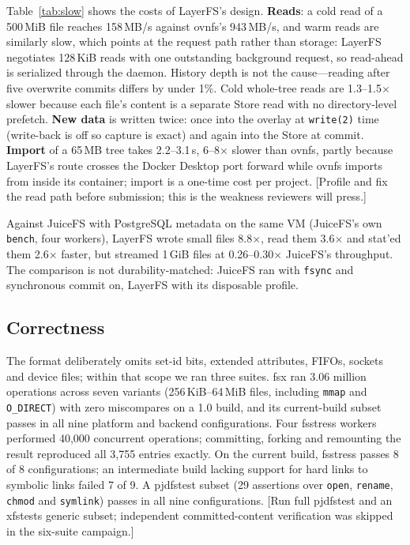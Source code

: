\documentclass[letterpaper,twocolumn,10pt]{article}
\newif\ifdraft\drafttrue
\newcommand{\dnote}[1]{\ifdraft\textcolor{red!70!black}{\textsf{\small[#1]}}\fi}
\newcommand{\sys}{LayerFS}
\newcommand{\X}{$\times$}
\begin{document}
Table~\ref{tab:slow} shows the costs of \sys{}'s design. \textbf{Reads}:
a cold read of a 500\,MiB file reaches 158\,MB/s against ovnfs's 943\,MB/s,
and warm reads are similarly slow, which points at the request path rather
than storage: \sys{} negotiates 128\,KiB reads with one outstanding
background request, so read-ahead is serialized through the daemon. History
depth is not the cause---reading after five overwrite commits differs by
under 1\%. Cold whole-tree reads are 1.3--1.5\X{} slower because each file's
content is a separate Store read with no directory-level prefetch.
\textbf{New data} is written twice: once into the overlay at
\texttt{write(2)} time (write-back is off so capture is exact) and again into
the Store at commit. \textbf{Import} of a 65\,MB tree takes 2.2--3.1\,s,
6--8\X{} slower than ovnfs, partly because \sys{}'s route crosses the
Docker Desktop port forward while ovnfs imports from inside its container;
import is a one-time cost per project. \dnote{Profile and fix the read
path before submission; this is the weakness reviewers will press.}

Against JuiceFS with PostgreSQL metadata on the same VM (JuiceFS's own
\texttt{bench}, four workers), \sys{} wrote small files 8.8\X{}, read them
3.6\X{} and stat'ed them 2.6\X{} faster, but streamed 1\,GiB files at
0.26--0.30\X{} JuiceFS's throughput. The comparison is not
durability-matched: JuiceFS ran with \texttt{fsync} and synchronous commit
on, \sys{} with its disposable profile.

\subsection{Correctness}

The format deliberately omits set-id bits, extended attributes, FIFOs,
sockets and device files; within that scope we ran three suites. fsx ran
3.06 million operations across seven variants (256\,KiB--64\,MiB files,
including \texttt{mmap} and \texttt{O\_DIRECT}) with zero miscompares on a
1.0 build, and its current-build subset passes in all nine platform and
backend configurations. Four fsstress workers performed 40,000 concurrent
operations; committing, forking and remounting the result reproduced all
3,755 entries exactly. On the current build, fsstress passes 8 of 8
configurations; an intermediate build lacking support for hard links to
symbolic links failed 7 of 9. A pjdfstest subset (29 assertions over
\texttt{open}, \texttt{rename}, \texttt{chmod} and \texttt{symlink}) passes
in all nine configurations. \dnote{Run full pjdfstest and an xfstests
generic subset; independent committed-content verification was skipped in
the six-suite campaign.}
\end{document}

